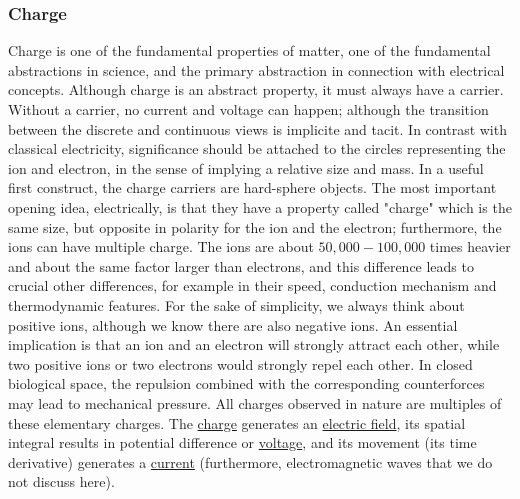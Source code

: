 \subsubsection[Charge]{Charge\label{sec:PHYSICS_ELECTRICCHARGE}}
Charge is one of the fundamental properties of matter,
one of the fundamental abstractions in science, and the primary abstraction in connection with electrical concepts.
Although charge is an abstract property, it must always have a carrier. Without a carrier, no current and voltage can happen;
although the transition between the discrete and continuous views
is implicite and tacit.
In contrast with classical electricity, 
significance should be attached to the circles representing the ion and electron, in the sense of implying a relative size and mass.
In a useful first construct, the charge carriers are hard-sphere objects.
The most important opening idea, electrically, is that they have a property called "charge" which is the same size, but opposite in polarity for the ion and the electron; furthermore, the ions can have multiple charge.
The ions are about $50,000-100,000$ times heavier and about the same factor larger than electrons, and this difference leads to crucial other differences, for example in their speed, conduction mechanism and thermodynamic features.
For the sake of simplicity, we always think about positive ions,
although we know there are also negative ions.
An essential implication is that an ion and an electron will strongly attract each other, while two positive ions or two electrons would strongly repel each other. 
In closed biological space, the repulsion combined with the corresponding counterforces may lead to 
mechanical pressure.
All charges observed in nature are multiples of these elementary charges. The
\href{http://hyperphysics.phy-astr.gsu.edu/hbase/hframe.html}{charge} generates an \href{http://hyperphysics.phy-astr.gsu.edu/hbase/hframe.html}{electric field}, its spatial integral results
in potential difference or \href{http://hyperphysics.phy-astr.gsu.edu/hbase/hframe.html}{voltage}, and its movement (its time derivative) generates a \href{http://hyperphysics.phy-astr.gsu.edu/hbase/hframe.html}{current}
(furthermore, electromagnetic waves that we do not discuss here).

